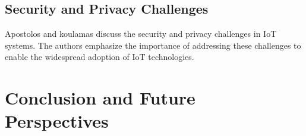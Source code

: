 \documentclass[conference]{IEEEtran}
\begin{document}
\subsection{Security and Privacy Challenges}
Apostolos and koulamas \cite{apostolos_2024_security} discuss the security and privacy challenges in IoT systems. The authors emphasize the importance of addressing these challenges to enable the widespread adoption of IoT technologies.

\section{Conclusion and Future Perspectives} \label{cap:conclusion}



\end{document}
